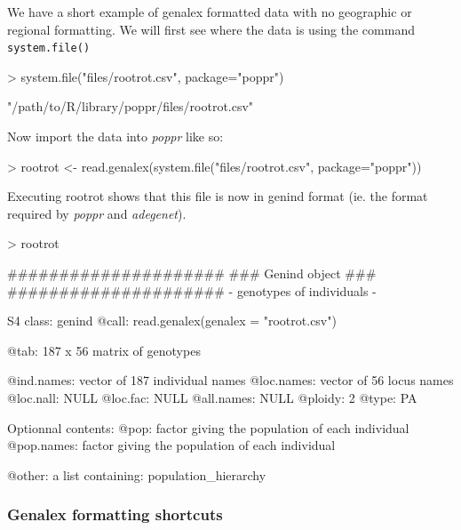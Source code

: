 \documentclass[letterpaper]{article}
\begin{document}
We have a short example of genalex formatted data with no geographic or regional formatting. We will first see where the data is using the command \texttt{system.file()}
\begin{Schunk}
\begin{Sinput}
> system.file("files/rootrot.csv", package="poppr")
\end{Sinput}
\end{Schunk}
\begin{Schunk}
\begin{Soutput}
[1] "/path/to/R/library/poppr/files/rootrot.csv"
\end{Soutput}
\end{Schunk}
Now import the data into \textit{poppr} like so:
\begin{Schunk}
\begin{Sinput}
> rootrot <- read.genalex(system.file("files/rootrot.csv", package="poppr"))
\end{Sinput}
\end{Schunk}
Executing rootrot shows that this file is now in genind format (ie. the format required by \textit{poppr} and \textit{adegenet}).
\begin{Schunk}
\begin{Sinput}
> rootrot
\end{Sinput}
\begin{Soutput}
   #####################
   ### Genind object ### 
   #####################
- genotypes of individuals - 

S4 class:  genind
@call: read.genalex(genalex = "rootrot.csv")

@tab:  187 x 56 matrix of genotypes

@ind.names: vector of  187 individual names
@loc.names: vector of  56 locus names
@loc.nall: NULL
@loc.fac: NULL
@all.names: NULL
@ploidy:  2
@type:  PA

Optionnal contents: 
@pop:  factor giving the population of each individual
@pop.names:  factor giving the population of each individual

@other: a list containing: population_hierarchy 
\end{Soutput}
\end{Schunk}

\subsubsection{Genalex formatting shortcuts}\label{intro:import:genalex.short}
\end{document}
